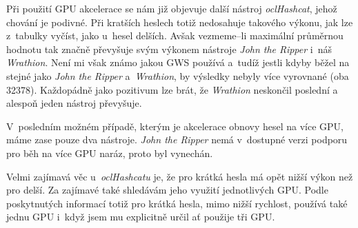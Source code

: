 Při použití GPU akcelerace se nám již objevuje další nástroj {\it oclHashcat}, jehož chování je
podivné. Při kratších heslech totiž nedosahuje takového výkonu, jak lze z~tabulky vyčíst, jako
u~hesel delších. Avšak vezmeme--li maximální průměrnou hodnotu tak značně převyšuje svým výkonem
nástroje {\it John the Ripper} i~náš {\it Wrathion}. Není mi však známo jakou GWS používá a~tudíž
jestli kdyby běžel na stejné jako {\it John the Ripper} a~{\it Wrathion}, by výsledky nebyly více
vyrovnané (oba 32378). Každopádně jako pozitivum lze brát, že {\it Wrathion} neskončil poslední a
alespoň jeden nástroj převyšuje.

V~posledním možném případě, kterým je akcelerace obnovy hesel na více GPU, máme zase pouze dva
nástroje. {\it John the Ripper} nemá v~dostupné verzi podporu pro běh na více GPU naráz, proto byl
vynechán. 

Velmi zajímavá věc u~{\it oclHashcatu} je, že pro krátká hesla má opět nižší výkon než pro delší.
Za zajímavé také shledávám jeho využití jednotlivých GPU. Podle poskytnutých informací totiž pro
krátká hesla, mimo nižší rychlost, používá také jednu GPU i~když jsem mu explicitně určil ať
použije tři GPU.
